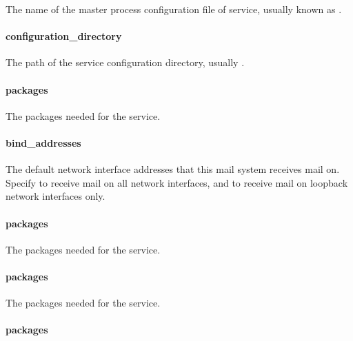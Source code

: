 
The name of the master process configuration file of 
service, usually known as .

\paragraph{configuration\_directory}


The path of the  service configuration directory, usually
.

\paragraph{packages}


The packages needed for the  service.

\paragraph{bind\_addresses}


The default network interface addresses that this mail system receives mail on.
Specify \literalall{} to receive mail on all network interfaces,
and \literalloopback{} to receive mail on loopback network interfaces only.

\paragraph{packages}


The packages needed for the  service.

\paragraph{packages}


The packages needed for the  service.

\paragraph{packages}


